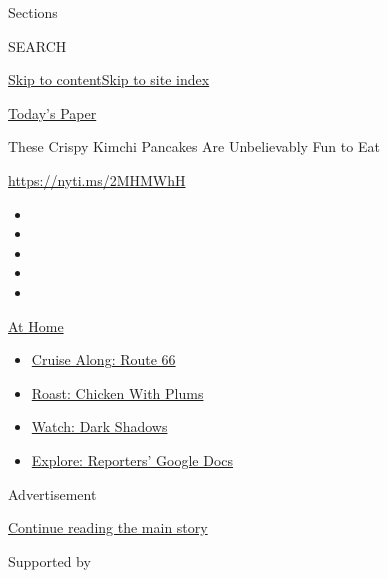 Sections

SEARCH

\protect\hyperlink{site-content}{Skip to
content}\protect\hyperlink{site-index}{Skip to site index}

\href{https://myaccount.nytimes3xbfgragh.onion/auth/login?response_type=cookie\&client_id=vi}{}

\href{https://www.nytimes3xbfgragh.onion/section/todayspaper}{Today's
Paper}

These Crispy Kimchi Pancakes Are Unbelievably Fun to Eat

\url{https://nyti.ms/2MHMWhH}

\begin{itemize}
\item
\item
\item
\item
\item
\end{itemize}

\href{https://www.nytimes3xbfgragh.onion/spotlight/at-home?action=click\&pgtype=Article\&state=default\&region=TOP_BANNER\&context=at_home_menu}{At
Home}

\begin{itemize}
\tightlist
\item
  \href{https://www.nytimes3xbfgragh.onion/2020/09/07/travel/route-66.html?action=click\&pgtype=Article\&state=default\&region=TOP_BANNER\&context=at_home_menu}{Cruise
  Along: Route 66}
\item
  \href{https://www.nytimes3xbfgragh.onion/2020/09/04/dining/sheet-pan-chicken.html?action=click\&pgtype=Article\&state=default\&region=TOP_BANNER\&context=at_home_menu}{Roast:
  Chicken With Plums}
\item
  \href{https://www.nytimes3xbfgragh.onion/2020/09/04/arts/television/dark-shadows-stream.html?action=click\&pgtype=Article\&state=default\&region=TOP_BANNER\&context=at_home_menu}{Watch:
  Dark Shadows}
\item
  \href{https://www.nytimes3xbfgragh.onion/interactive/2020/at-home/even-more-reporters-editors-diaries-lists-recommendations.html?action=click\&pgtype=Article\&state=default\&region=TOP_BANNER\&context=at_home_menu}{Explore:
  Reporters' Google Docs}
\end{itemize}

Advertisement

\protect\hyperlink{after-top}{Continue reading the main story}

Supported by

